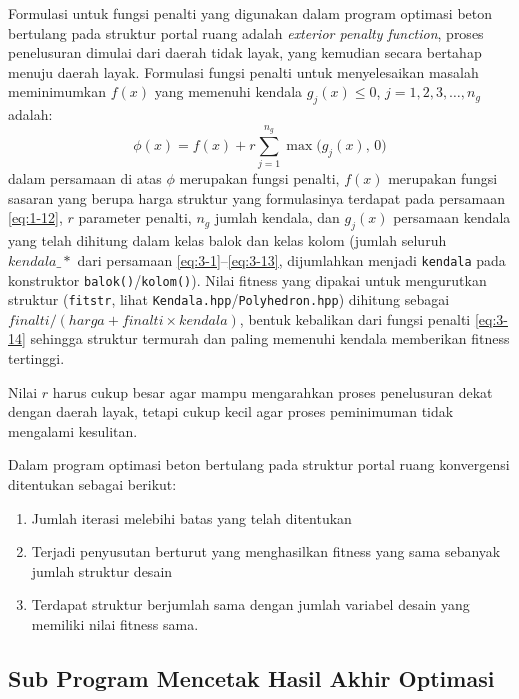 Formulasi untuk fungsi penalti yang digunakan dalam program optimasi
beton bertulang pada struktur portal ruang adalah \textit{exterior
penalty function}, proses penelusuran dimulai dari daerah tidak layak,
yang kemudian secara bertahap menuju daerah layak. Formulasi fungsi
penalti untuk menyelesaikan masalah meminimumkan $f(x)$ yang memenuhi
kendala $g_j(x) \le 0$, $j=1,2,3,\ldots,n_g$ adalah:
\begin{equation}
\phi(x) = f(x) + r \sum_{j=1}^{n_g} \max\bigl(g_j(x),\,0\bigr)
\label{eq:3-14}
\end{equation}
dalam persamaan di atas $\phi$ merupakan fungsi penalti, $f(x)$ merupakan
fungsi sasaran yang berupa harga struktur yang formulasinya terdapat pada
persamaan \eqref{eq:1-12}, $r$ parameter penalti, $n_g$ jumlah kendala,
dan $g_j(x)$ persamaan kendala yang telah dihitung dalam kelas balok dan
kelas kolom (jumlah seluruh $\mathit{kendala\_*}$ dari persamaan
\eqref{eq:3-1}--\eqref{eq:3-13}, dijumlahkan menjadi \texttt{kendala}
pada konstruktor \texttt{balok()}/\texttt{kolom()}). Nilai fitness yang
dipakai untuk mengurutkan struktur (\texttt{fitstr}, lihat
\texttt{Kendala.hpp}/\texttt{Polyhedron.hpp}) dihitung sebagai
$\mathit{finalti}/(\mathit{harga} + \mathit{finalti}\times\mathit{kendala})$,
bentuk kebalikan dari fungsi penalti \eqref{eq:3-14} sehingga struktur
termurah dan paling memenuhi kendala memberikan fitness tertinggi.

Nilai $r$ harus cukup besar agar mampu mengarahkan proses penelusuran
dekat dengan daerah layak, tetapi cukup kecil agar proses peminimuman
tidak mengalami kesulitan.

Dalam program optimasi beton bertulang pada struktur portal ruang
konvergensi ditentukan sebagai berikut:
\begin{enumerate}[label=\arabic*.]
\item Jumlah iterasi melebihi batas yang telah ditentukan
\item Terjadi penyusutan berturut yang menghasilkan fitness yang sama
      sebanyak jumlah struktur desain
\item Terdapat struktur berjumlah sama dengan jumlah variabel desain
      yang memiliki nilai fitness sama.
\end{enumerate}

\subsection{Sub Program Mencetak Hasil Akhir Optimasi}

